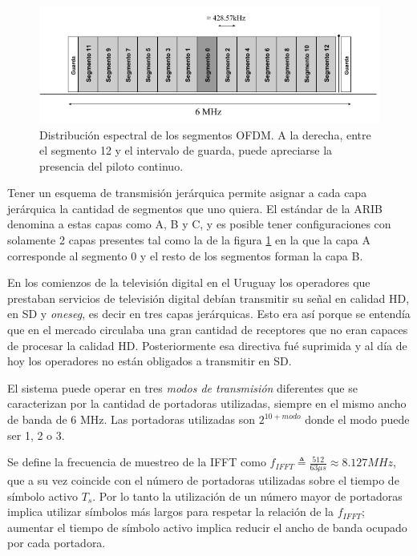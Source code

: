 \begin{figure}[h!]
	\centering
	\includegraphics[scale=0.55]{figuras/cap03/segmentos_isdbt}
	\caption{\label{segmentos_isdbt} Distribuci\'on espectral de los segmentos OFDM. A la derecha, entre el segmento 12 y el intervalo de guarda, puede apreciarse la presencia del piloto continuo.}
\end{figure}

Tener un esquema de transmisi\'on jer\'arquica permite asignar a cada capa jer\'arquica la cantidad de segmentos que uno quiera. El est\'andar de la ARIB denomina a estas capas como A, B y C, y es posible tener configuraciones con solamente 2 capas presentes tal como la de la figura \ref{segmentos_isdbt} en la que la capa A corresponde al segmento 0 y el resto de los segmentos forman la capa B.

En los comienzos de la televisi\'on digital en el Uruguay los operadores que prestaban servicios de televisi\'on digital deb\'ian transmitir su señal en calidad \gls{HD}, en \gls{SD} y \textit{oneseg}, es decir en tres capas jer\'arquicas. Esto era as\'i porque se entend\'ia que en el mercado circulaba una gran cantidad de receptores que no eran capaces de procesar la calidad HD. Posteriormente esa directiva fu\'e suprimida y al d\'ia de hoy los operadores no est\'an obligados a transmitir en SD.



El sistema puede operar en tres \textit{modos de transmisi\'on} diferentes que se caracterizan por la cantidad de portadoras utilizadas, siempre en el mismo ancho de banda de 6 MHz. Las portadoras utilizadas son $2^{10+modo}$ donde el modo puede ser 1, 2 o 3.

Se define la frecuencia de muestreo de la \gls{IFFT} como $f_{IFFT} \triangleq \frac{512}{63 \mu s} \approx 8.127 MHz$, que a su vez coincide con el n\'umero de portadoras utilizadas sobre el tiempo de s\'imbolo activo $T_s$. Por lo tanto la utilizaci\'on de un n\'umero mayor de portadoras implica utilizar s\'imbolos m\'as largos para respetar la relaci\'on de la $f_{IFFT}$; aumentar el tiempo de s\'imbolo activo implica reducir el ancho de banda ocupado por cada portadora.

